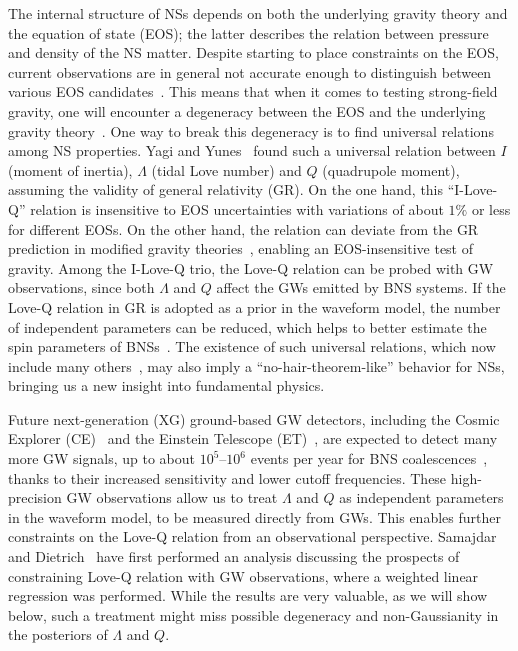 \documentclass[a4paper,11pt]{article}
\begin{document}
The internal structure of NSs depends on both the underlying gravity theory and
the equation of state (EOS); the latter describes the relation between pressure
and density of the NS matter. Despite starting to place constraints on the EOS,
current observations are in general not accurate enough to distinguish between
various EOS candidates~\cite{Lattimer:2006xb, Steiner:2010fz, Ozel:2010fw,
Hebeler:2013nza, Ozel_2013}.  This means that when it comes to testing
strong-field gravity, one will encounter a degeneracy between the EOS and the
underlying gravity theory~\cite{Yagi:2013bca, Yagi:2013awa, Shao:2017gwu,
Shao:2019gjj, Silva:2020acr, Shao:2022koz}.  One way to break this degeneracy is
to find universal relations among NS properties.  Yagi and
Yunes~\cite{Yagi:2013bca, Yagi:2013awa} found such a universal relation between 
$I$ (moment of inertia), $\Lambda$ (tidal Love number) and $Q$ (quadrupole
moment), assuming the validity of general relativity (GR).  On the one hand,
this ``I-Love-Q'' relation is insensitive to EOS uncertainties with variations
of about $1\%$ or less for different EOSs.  On the other hand, the relation can
deviate from the GR prediction in modified gravity theories~\cite{Yagi_2017,
Gupta:2017vsl, Yunes:2025xwp}, enabling an EOS-insensitive test of gravity.
Among the I-Love-Q trio, the Love-Q relation can be probed with GW observations,
since both $\Lambda$ and $Q$ affect the GWs emitted by BNS systems.  If the
Love-Q relation in GR is adopted as a prior in the waveform model, the number of
independent parameters can be reduced, which helps to better estimate the spin
parameters of BNSs~\cite{Yagi:2013bca, LIGOScientific:2018cki,
LIGOScientific:2018hze, LIGOScientific:2020aai}. The existence of such universal
relations, which now include many others~\cite{Lau:2009bu, Yagi:2013sva,
Maselli:2013mva, Pani:2015nua, Yagi:2016qmr, Gao:2023mwu, Hu:2025gab}, may also
imply a ``no-hair-theorem-like'' behavior for NSs, bringing us a new insight
into fundamental physics. 

Future next-generation (XG) ground-based GW detectors, including the Cosmic
Explorer (CE)~\cite{Reitze:2019iox, Reitze:2019dyk} and the Einstein Telescope
(ET)~\cite{Punturo:2010zz, Hild:2010id, Sathyaprakash:2012jk, ET:2025xjr}, are
expected to detect many more GW signals, up to about $10^5$--$10^6$ events per
year for BNS coalescences~\cite{LIGOScientific:2017zlf, Sathyaprakash:2019yqt, Kalogera:2021bya,
Samajdar:2021egv}, thanks to their increased sensitivity and lower cutoff
frequencies. These high-precision GW observations allow us to treat $\Lambda$
and $Q$ as independent parameters in the waveform model, to be measured directly
from GWs. This enables further constraints on the Love-Q relation from an
observational perspective.  Samajdar and Dietrich~\cite{Samajdar:2020xrd} have
first performed an analysis discussing the prospects of constraining Love-Q 
relation with GW observations, where a weighted linear regression was performed.
While the results are very valuable, as we will show below, such a treatment
might miss possible degeneracy and non-Gaussianity in the posteriors of
$\Lambda$ and $Q$. 
\end{document}
